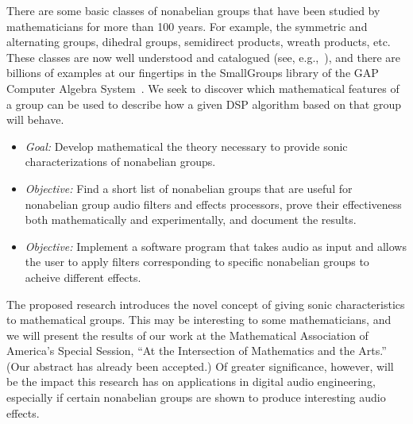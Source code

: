 \documentclass[10pt]{article}
\begin{document}
There are some basic classes of nonabelian groups that have been studied by
mathematicians for more than 100 years.  For example, the symmetric and 
alternating groups, dihedral groups, semidirect products, wreath products,
etc.  These classes are now well understood and catalogued 
(see, e.g.,~\cite{ATLAS:1986}), and there are billions of examples at our
fingertips in the SmallGroups library of the GAP Computer Algebra System~\cite{GAP4}.   
We seek to discover which mathematical features of a group can be used to
describe how a given DSP algorithm based on that group will behave. 

\begin{itemize}
\item {\it Goal:}
Develop mathematical the theory necessary to provide sonic characterizations of nonabelian groups.
\item
{\it Objective:} Find a short list of nonabelian groups that are useful for
nonabelian group audio filters and effects processors, prove their effectiveness
both mathematically and experimentally, and document the results.
\item
{\it Objective:} Implement a software program that takes audio as input and
allows the user to apply filters corresponding to specific nonabelian groups to
acheive different effects. 
\end{itemize}

 
\vskip5mm

The proposed research introduces the novel concept of giving sonic
characteristics to mathematical groups.  This may be interesting to 
some mathematicians, and we will present the results of our work at the Mathematical
Association of America's Special Session, ``At the Intersection of Mathematics
and the Arts.'' (Our  abstract has already been accepted.) 
Of greater significance, however, will be the impact this
research has on applications in digital audio engineering, especially if certain
nonabelian groups are shown to produce interesting audio effects.   
 
\end{document}
